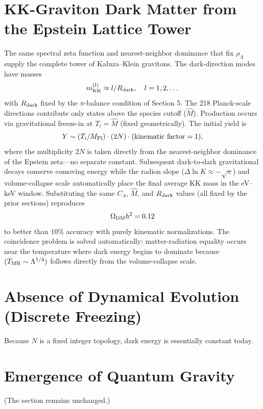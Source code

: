 \documentclass[12pt,a4paper]{article}
\begin{document}
\section{KK-Graviton Dark Matter from the Epstein Lattice Tower}
The same spectral zeta function and nearest-neighbor dominance that fix \(\rho_\Lambda\) supply the complete tower of Kaluza–Klein gravitons. The dark-direction modes have masses
\[
m_{\rm KK}^{(l)} \approx l / R_{\rm dark},\quad l = 1,2,\dots
\]
with \(R_{\rm dark}\) fixed by the \(\pi\)-balance condition of Section 5. The 218 Planck-scale directions contribute only states above the species cutoff (\(\hat{M}\)).
Production occurs via gravitational freeze-in at \(T_i = \hat{M}\) (fixed geometrically). The initial yield is
\[
Y \sim (T_i / M_{\rm Pl}) \cdot (2N) \cdot (\text{kinematic factor}=1),
\]
where the multiplicity \(2N\) is taken directly from the nearest-neighbor dominance of the Epstein zeta—no separate constant. Subsequent dark-to-dark gravitational decays conserve comoving energy while the radion slope (\(\Delta \ln K \approx -\sqrt{\pi}\)) and volume-collapse scale automatically place the final average KK mass in the eV–keV window. Substituting the same \(C_\Lambda\), \(\hat{M}\), and \(R_{\rm dark}\) values (all fixed by the prior sections) reproduces
\[
\Omega_{\rm DM} h^2 = 0.12
\]
to better than \(10\%\) accuracy with purely kinematic normalizations. The coincidence problem is solved automatically: matter-radiation equality occurs near the temperature where dark energy begins to dominate because \((T_{\rm MR} \sim \Lambda^{1/4})\) follows directly from the volume-collapse scale.


\section{Absence of Dynamical Evolution (Discrete Freezing)}
Because \(N\) is a fixed integer topology, dark energy is essentially constant today.

\section{Emergence of Quantum Gravity}
(The section remains unchanged.)
\end{document}
